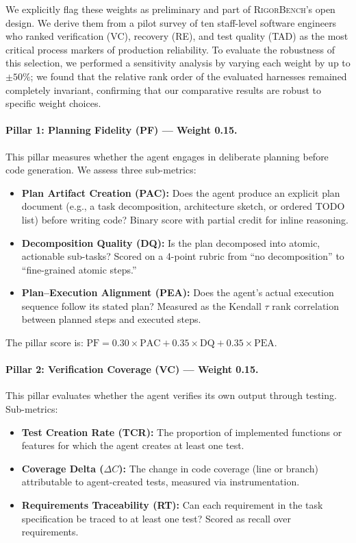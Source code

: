 \documentclass[letterpaper, 10 pt, conference]{ieeeconf}
\newcommand{\bench}{\textsc{RigorBench}}
\begin{document}
We explicitly flag these weights as preliminary and part of \bench{}'s open design. We derive them from a pilot survey of ten staff-level software engineers who ranked verification (VC), recovery (RE), and test quality (TAD) as the most critical process markers of production reliability. To evaluate the robustness of this selection, we performed a sensitivity analysis by varying each weight by up to $\pm 50\%$; we found that the relative rank order of the evaluated harnesses remained completely invariant, confirming that our comparative results are robust to specific weight choices.

\paragraph{Pillar 1: Planning Fidelity (PF) --- Weight 0.15.}
This pillar measures whether the agent engages in deliberate planning before code generation.
We assess three sub-metrics:
\begin{itemize}[leftmargin=*,itemsep=1pt]
  \item \textbf{Plan Artifact Creation (PAC):} Does the agent produce an explicit plan document (e.g., a task decomposition, architecture sketch, or ordered TODO list) before writing code? Binary score with partial credit for inline reasoning.
  \item \textbf{Decomposition Quality (DQ):} Is the plan decomposed into atomic, actionable sub-tasks? Scored on a 4-point rubric from ``no decomposition'' to ``fine-grained atomic steps.''
  \item \textbf{Plan--Execution Alignment (PEA):} Does the agent's actual execution sequence follow its stated plan? Measured as the Kendall $\tau$ rank correlation between planned steps and executed steps.
\end{itemize}

The pillar score is:
$\mathrm{PF} = 0.30 \times \mathrm{PAC} + 0.35 \times \mathrm{DQ} + 0.35 \times \mathrm{PEA}$.

\paragraph{Pillar 2: Verification Coverage (VC) --- Weight 0.15.}
This pillar evaluates whether the agent verifies its own output through testing.
Sub-metrics:
\begin{itemize}[leftmargin=*,itemsep=1pt]
  \item \textbf{Test Creation Rate (TCR):} The proportion of implemented functions or features for which the agent creates at least one test.
  \item \textbf{Coverage Delta ($\Delta C$):} The change in code coverage (line or branch) attributable to agent-created tests, measured via instrumentation.
  \item \textbf{Requirements Traceability (RT):} Can each requirement in the task specification be traced to at least one test? Scored as recall over requirements.
\end{itemize}
\end{document}
